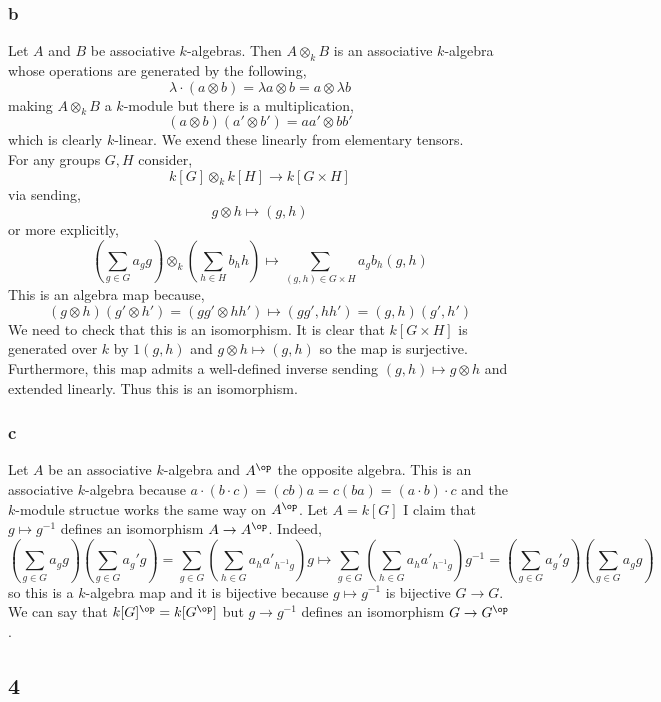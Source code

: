 \documentclass[12pt]{article}
\begin{document}
\subsubsection{b}

Let $A$ and $B$ be associative $k$-algebras. Then $A \otimes_k B$ is an associative $k$-algebra whose operations are generated by the following,
\[ \lambda \cdot (a \otimes b) = \lambda a \otimes b = a \otimes \lambda b \]
making $A \otimes_k B$ a $k$-module but there is a multiplication,
\[ (a \otimes b)(a' \otimes b') = aa' \otimes bb' \]
which is clearly $k$-linear. We exend these linearly from elementary tensors. 
\bigskip\\
For any groups $G, H$ consider,
\[ k[G] \otimes_k k[H] \to k[G \times H] \]
via sending,
\[ g \otimes h \mapsto (g, h) \]
or more explicitly,
\[ \left( \sum_{g \in G} a_g g \right) \otimes_k \left( \sum_{h \in H} b_h h \right) \mapsto \sum_{(g,h) \in G \times H} a_g b_h (g, h) \]
This is an algebra map because,
\[ (g \otimes h) (g' \otimes h') = (g g' \otimes h h') \mapsto (gg', hh') = (g, h)(g',h') \]
We need to check that this is an isomorphism. It is clear that $k[G \times H]$ is generated over $k$ by $1 (g, h)$ and $g \otimes h \mapsto (g, h)$ so the map is surjective. Furthermore, this map admits a well-defined inverse sending $(g, h) \mapsto g \otimes h$ and extended linearly. Thus this is an isomorphism.

\subsubsection{c}

Let $A$ be an associative $k$-algebra and $A^\op$ the opposite algebra. This is an associative $k$-algebra because $a \cdot (b \cdot c) = (cb)a = c(ba) = (a \cdot b) \cdot c$ and the $k$-module structue works the same way on $A^\op$. Let $A = k[G]$ I claim that $g \mapsto g^{-1}$ defines an isomorphism $A \to A^\op$. Indeed, 
\[ \left( \sum_{g \in G} a_g g \right) \left( \sum_{g \in G} a_g' g \right) = \sum_{g \in G} \left( \sum_{h \in G} a_h a'_{h^{-1} g} \right) g  \mapsto \sum_{g \in G} \left( \sum_{h \in G} a_h a'_{h^{-1} g} \right) g^{-1} = \left( \sum_{g \in G} a_g' g \right) \left( \sum_{g \in G} a_g g \right) \]
so this is a $k$-algebra map and it is bijective because $g \mapsto g^{-1}$ is bijective $G \to G$. We can say that $k[G]^\op = k[G^\op]$ but $g \to g^{-1}$ defines an isomorphism $G \to G^\op$.

\subsection{4}
\end{document}
